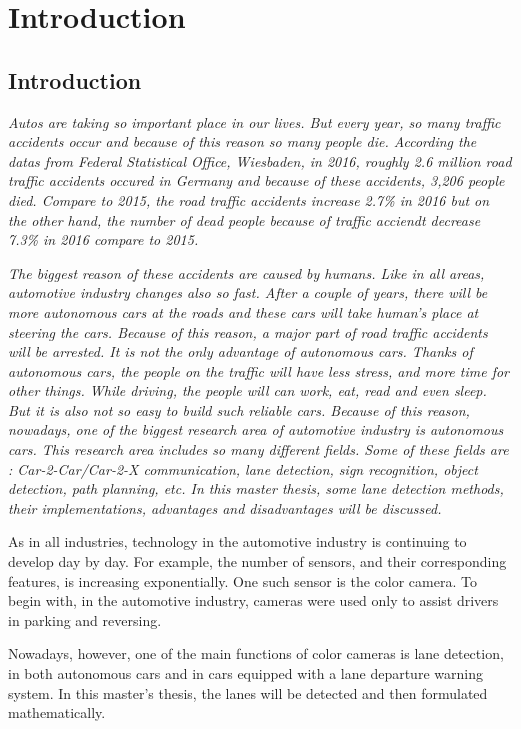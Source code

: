 
\chapter{Introduction}\label{cha:Intro}

\section{Introduction}\label{sec:Introduction}

\emph{\color{blue}Autos are taking so important place in our lives. But every year, so many traffic accidents occur and because of this reason so many people die. According the datas from  Federal Statistical Office, Wiesbaden, in 2016, roughly 2.6 million road traffic accidents occured in Germany and because of these accidents, 3,206 people died. Compare to 2015, the road traffic accidents increase 2.7\% in 2016 but on the other hand, the number of dead people because of traffic acciendt decrease 7.3\% in 2016 compare to 2015\cite{Statis}.}

\emph{\color{blue}The biggest reason of these accidents are caused by humans. Like in all areas, automotive industry changes also so fast. After a couple of years, there will be more autonomous cars at the roads and these cars will take human's place at steering the cars. Because of this reason, a major part of road traffic accidents will be arrested. It is not the only advantage of autonomous cars. Thanks of autonomous cars, the people on the traffic will have less stress, and more time for other things. While driving, the people will can work, eat, read and even sleep. But it is also not so easy to build such reliable cars. Because of this reason, nowadays, one of the biggest research area of automotive industry is autonomous cars. This research area includes so many different fields. Some of these fields are : Car-2-Car/Car-2-X communication, lane detection, sign recognition, object detection, path planning, etc. In this master thesis, some lane detection methods, their implementations, advantages and disadvantages will be discussed.}

As in all industries, technology in the automotive industry is continuing to develop day by day. For example, the number of sensors, and their corresponding features, is increasing exponentially. One such sensor is the color camera. To begin with, in the automotive industry, cameras were used only to assist drivers in parking and reversing.
 
Nowadays, however, one of the main functions of color cameras is lane detection, in both autonomous cars and in cars equipped with a lane departure warning system. In this master's thesis, the lanes will be detected and then formulated mathematically.


